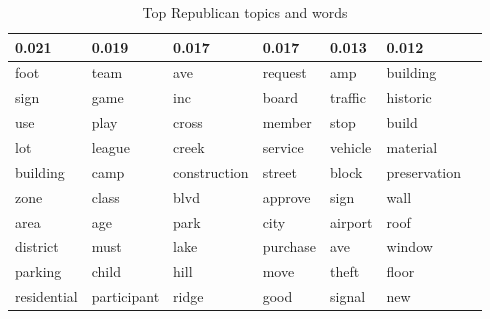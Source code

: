 \begin{table}[ht]
\centering
\scriptsize
\begin{tabular}{lllllll}
  \hline
 0.021 & 0.019 & 0.017 & 0.017 & 0.013 & 0.012 \\ 
  \hline
 foot & team & ave & request & amp & \cellcolor{red!25}building \\ 
   \cellcolor{red!25}sign & game & inc & board &\cellcolor{red!25} traffic & historic \\ 
   use & play & cross & member & stop & \cellcolor{red!25}build \\ 
   lot & league & creek & service & vehicle & material \\ 
   \cellcolor{red!25}building & camp & \cellcolor{red!25}construction & \cellcolor{red!25}street & block & preservation \\ 
   \cellcolor{red!25}zone & class & blvd & approve & sign & \cellcolor{red!25}wall \\ 
   area & age & park & city &  \cellcolor{red!25}airport & \cellcolor{red!25}roof \\ 
   district & must & lake & purchase & ave & window \\ 
   \cellcolor{red!25}parking & child & hill & move & theft & \cellcolor{red!25}floor \\ 
   residential & participant & ridge & good & signal & new \\ 
   \hline
\end{tabular}
\caption{Top Republican topics and words}%
\label{tabSTMINRep}
\end{table}

